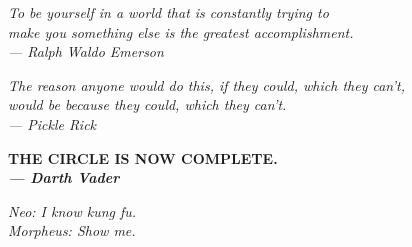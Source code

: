 \documentclass[
thesis.tex
]{subfiles}
\begin{document}
	\newpage
	\null
	\vfill
	
	\begin{flushright}
		\textit{To be yourself in a world that is constantly trying to \\ make you something else is the greatest accomplishment. \\ --- Ralph Waldo Emerson}
	\end{flushright}
	
	\begin{flushright}
		\textit{
			The reason anyone would do this, if they could, which they can't, \\ 
			would be because they could, which they can't. \\
			--- Pickle Rick}
	\end{flushright}
	
	\begin{flushright}
		\textsf{
			\textbf{
				THE CIRCLE IS NOW COMPLETE.\\
				\textit{
					--- Darth Vader
				}		
			}
		}
	\end{flushright}
	
	\begin{flushright}
		
		\textit{
			Neo: I know kung fu. \\
			Morpheus: Show me.}
		
	\end{flushright}
	
	\vspace{4cm}
	
	\thispagestyle{empty}	
\end{document}

